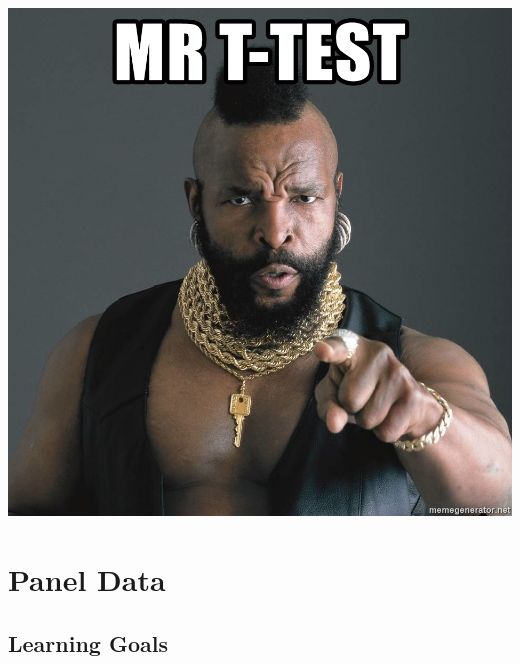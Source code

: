 \documentclass[
]{book}
\begin{document}
\includegraphics{images/mr-t-test.jpg}

\hypertarget{panel-data}{%
\chapter{Panel Data}\label{panel-data}}

\hypertarget{learning-goals-2}{%
\section{Learning Goals}\label{learning-goals-2}}
\end{document}

